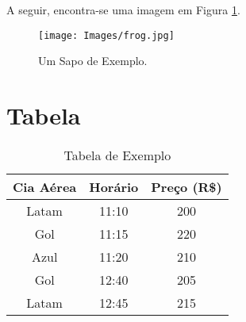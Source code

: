 \documentclass[twocolumn]{article}
\begin{document}
    A seguir, encontra-se uma imagem em Figura \ref{fig:figure}.

    \begin{figure}[htpb]
        \caption{Um Sapo de Exemplo.}
        \label{fig:figure}
        \centering
        \texttt{[image: Images/frog.jpg]}
    \end{figure}

\section{Tabela}

    \begin{table}[htpb]
        \centering
        \begin{tabular}{ c c c }
             
             \hline
             Cia Aérea & Horário & Preço (R\$)\\
             \hline

             Latam & 11:10 & 200 \\
             Gol & 11:15 & 220\\
             Azul & 11:20 & 210\\
             Gol & 12:40 & 205\\
             Latam & 12:45 & 215\\
             \hline
             
        \end{tabular}
        \caption{Tabela de Exemplo}
        \label{tab:placeholder}
    \end{table}

    \nocite{*}
    
    
\end{document}
